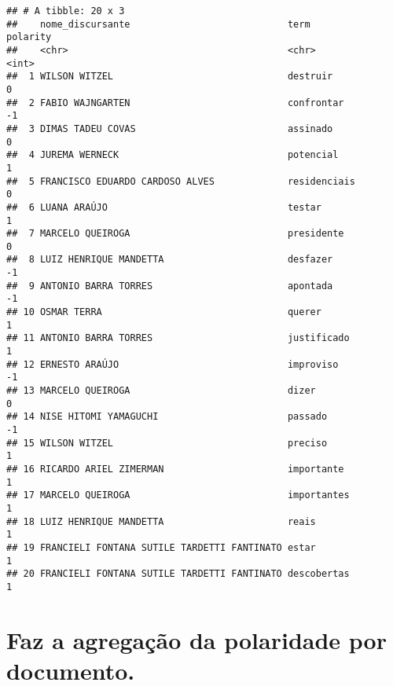 \documentclass[
]{article}
\newenvironment{Shaded}{\begin{snugshade}}{\end{snugshade}}
\newcommand{\CommentTok}[1]{\textcolor[rgb]{0.56,0.35,0.01}{\textit{#1}}}
\newcommand{\DataTypeTok}[1]{\textcolor[rgb]{0.13,0.29,0.53}{#1}}
\newcommand{\KeywordTok}[1]{\textcolor[rgb]{0.13,0.29,0.53}{\textbf{#1}}}
\newcommand{\NormalTok}[1]{#1}
\newcommand{\OperatorTok}[1]{\textcolor[rgb]{0.81,0.36,0.00}{\textbf{#1}}}
\newcommand{\StringTok}[1]{\textcolor[rgb]{0.31,0.60,0.02}{#1}}
\begin{document}
\begin{verbatim}
## # A tibble: 20 x 3
##    nome_discursante                            term         polarity
##    <chr>                                       <chr>           <int>
##  1 WILSON WITZEL                               destruir            0
##  2 FABIO WAJNGARTEN                            confrontar         -1
##  3 DIMAS TADEU COVAS                           assinado            0
##  4 JUREMA WERNECK                              potencial           1
##  5 FRANCISCO EDUARDO CARDOSO ALVES             residenciais        0
##  6 LUANA ARAÚJO                                testar              1
##  7 MARCELO QUEIROGA                            presidente          0
##  8 LUIZ HENRIQUE MANDETTA                      desfazer           -1
##  9 ANTONIO BARRA TORRES                        apontada           -1
## 10 OSMAR TERRA                                 querer              1
## 11 ANTONIO BARRA TORRES                        justificado         1
## 12 ERNESTO ARAÚJO                              improviso          -1
## 13 MARCELO QUEIROGA                            dizer               0
## 14 NISE HITOMI YAMAGUCHI                       passado            -1
## 15 WILSON WITZEL                               preciso             1
## 16 RICARDO ARIEL ZIMERMAN                      importante          1
## 17 MARCELO QUEIROGA                            importantes         1
## 18 LUIZ HENRIQUE MANDETTA                      reais               1
## 19 FRANCIELI FONTANA SUTILE TARDETTI FANTINATO estar               1
## 20 FRANCIELI FONTANA SUTILE TARDETTI FANTINATO descobertas         1
\end{verbatim}

\hypertarget{faz-a-agregauxe7uxe3o-da-polaridade-por-documento.}{%
\section{Faz a agregação da polaridade por
documento.}\label{faz-a-agregauxe7uxe3o-da-polaridade-por-documento.}}

\begin{Shaded}
\end{Shaded}
\end{document}
